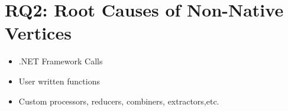 \section{RQ2: Root Causes of Non-Native Vertices}
\begin{itemize}
\item .NET Framework Calls
\item User written functions
\item Custom processors, reducers, combiners, extractors,etc.
\end{itemize}

